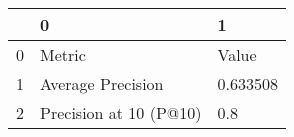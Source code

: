 \begin{tabular}{lll}
\toprule
{} &                       0 &         1 \\
\midrule
0 &                  Metric &     Value \\
1 &       Average Precision &  0.633508 \\
2 &  Precision at 10 (P@10) &       0.8 \\
\bottomrule
\end{tabular}
